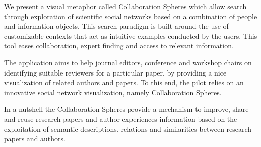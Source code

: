 We present a visual metaphor called Collaboration Spheres which allow search through exploration of scientific social networks based on a combination of people and information objects. This search paradigm is built around the use of customizable contexts that act as intuitive examples conducted by the users. This tool eases collaboration, expert finding and access to relevant information.

The application aims to help journal editors, conference and workshop chairs on identifying suitable reviewers for a particular paper, by providing a nice visualization of related authors and papers. To this end, the pilot relies on an innovative social network visualization, namely Collaboration Spheres. 

In a nutshell the Collaboration Spheres provide a mechanism to improve, share and reuse research papers and author experiences information based on the exploitation of semantic descriptions, relations and similarities between research papers and authors.





